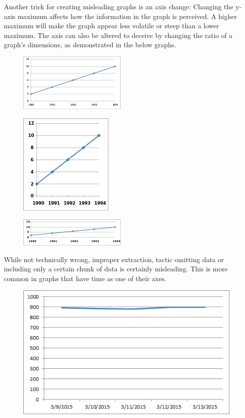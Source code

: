 \documentclass[]{book}
\theoremstyle{definition}
\theoremstyle{definition}
\theoremstyle{definition}
\theoremstyle{remark}
\begin{document}
Another trick for creating misleading graphs is an axis change: Changing
the y-axis maximum affects how the information in the graph is
perceived. A higher maximum will make the graph appear less volatile or
steep than a lower maximum. The axis can also be altered to deceive by
changing the ratio of a graph's dimensions, as demonstrated in the below
graphs.

\begin{figure}
\centering
\includegraphics{images/Line_graph1.svg.png}
\caption{}
\end{figure}

\begin{figure}
\centering
\includegraphics{images/175px-Line_graph1-3.svg.png}
\caption{}
\end{figure}

\begin{figure}
\centering
\includegraphics{images/200px-Line_graph1-4.svg.png}
\caption{}
\end{figure}

While not technically wrong, improper extraction, tactic omitting data
or including only a certain chunk of data is certainly misleading. This
is more common in graphs that have time as one of their axes.

\begin{figure}
\centering
\includegraphics{images/Bad_graph_extraction.png}
\caption{}
\end{figure}
\end{document}
